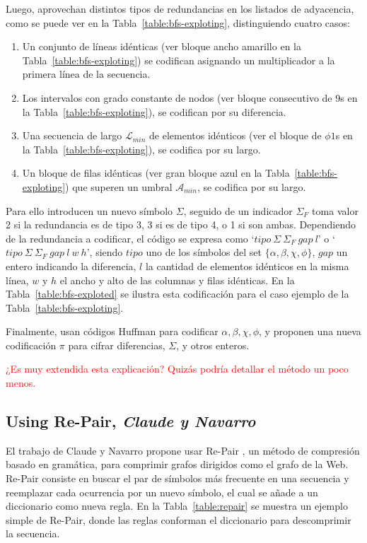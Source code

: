 

Luego, aprovechan distintos tipos de redundancias en los listados de adyacencia, como se puede ver en la Tabla~\ref{table:bfs-exploting}, distinguiendo cuatro casos:

\begin{enumerate}
	\item Un conjunto de líneas idénticas (ver bloque ancho amarillo en la Tabla~\ref{table:bfs-exploting}) se codifican asignando un multiplicador a la primera línea de la secuencia.
	\item Los intervalos con grado constante de nodos (ver bloque consecutivo de 9s en la Tabla~\ref{table:bfs-exploting}), se codifican por su diferencia.
	\item Una secuencia de largo $\mathcal{L}_{min}$ de elementos idénticos (ver el bloque de $\phi1$s en la Tabla~\ref{table:bfs-exploting}), se codifica por su largo.
	\item Un bloque de filas idénticas (ver gran bloque azul en la Tabla~\ref{table:bfs-exploting}) que superen un umbral $\mathcal{A}_{min}$, se codifica por su largo.
\end{enumerate}



Para ello introducen un nuevo símbolo $\Sigma$, seguido de un indicador $\Sigma_{F}$ toma valor 2 si la redundancia es de tipo 3, 3 si es de tipo 4, o 1 si son ambas. Dependiendo de la redundancia a codificar, el código se expresa como `$tipo\:\Sigma\:\Sigma_{F}\:gap\:l$'  o `$tipo\:\Sigma\:\Sigma_{F}\:gap\:l\:w\:h$', siendo $tipo$ uno de los símbolos del set $\{\alpha, \beta, \chi, \phi\}$, $gap$ un entero indicando la diferencia, $l$ la cantidad de elementos idénticos en la misma línea, $w$ y $h$ el ancho y alto de las columnas y filas idénticas. En la Tabla~\ref{table:bfs-exploted} se ilustra esta codificación para el caso ejemplo de la Tabla~\ref{table:bfs-exploting}.



Finalmente, usan códigos Huffman para codificar $\alpha, \beta, \chi, \phi$, y proponen una nueva codificación $\pi$ para cifrar diferencias, $\Sigma$, y otros enteros.

\textcolor{red}{¿Es muy extendida esta explicación? Quizás podría detallar el método un poco menos.}


\subsection{Using Re-Pair, \textit{Claude y Navarro}}
El trabajo de Claude y Navarro \cite{claude2010fast} propone usar Re-Pair \cite{larsson2000off}, un método de compresión basado en gramática, para comprimir grafos dirigidos como el grafo de la Web. Re-Pair consiste en buscar el par de símbolos más frecuente en una secuencia y reemplazar cada ocurrencia por un nuevo símbolo, el cual se añade a un diccionario como nueva regla. En la Tabla~\ref{table:repair} se muestra un ejemplo simple de Re-Pair, donde las reglas conforman el diccionario para descomprimir la secuencia.

